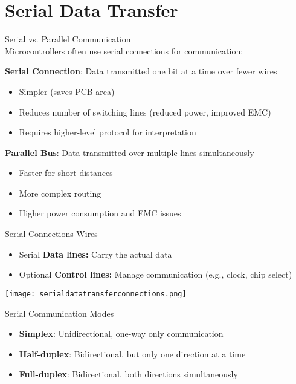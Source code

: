 \section{Serial Data Transfer}



\begin{definition}{Serial vs. Parallel Communication}\\
Microcontrollers often use serial connections for communication:

\textbf{Serial Connection}: Data transmitted one bit at a time over fewer wires
    \begin{itemize}
        \item Simpler (saves PCB area)
        \item Reduces number of switching lines (reduced power, improved EMC)
        \item Requires higher-level protocol for interpretation
    \end{itemize}
\textbf{Parallel Bus}: Data transmitted over multiple lines simultaneously
    \begin{itemize}
        \item Faster for short distances
        \item More complex routing
        \item Higher power consumption and EMC issues
    \end{itemize}
\end{definition}

\begin{concept}{Serial Connections} Wires
        \begin{itemize}
            \item Serial \textbf{Data lines:} Carry the actual data
            \item Optional \textbf{Control lines:} Manage communication (e.g., clock, chip select)
        \end{itemize}
        \texttt{[image: serialdatatransferconnections.png]}
\end{concept}

\begin{concept}{Serial Communication Modes}
\begin{itemize}
    \item \textbf{Simplex}: Unidirectional, one-way only communication
    \item \textbf{Half-duplex}: Bidirectional, but only one direction at a time
    \item \textbf{Full-duplex}: Bidirectional, both directions simultaneously
\end{itemize}
\end{concept}

